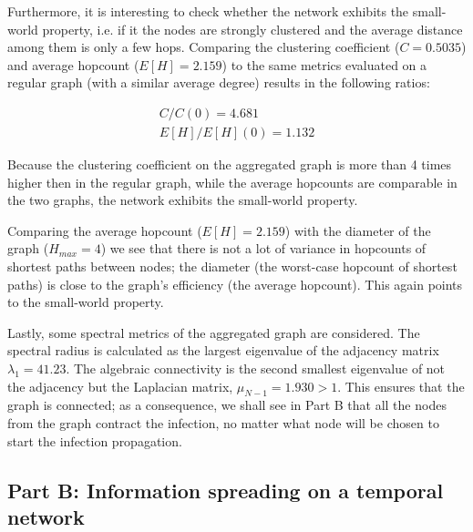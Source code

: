 \documentclass[letterpaper]{article}
\begin{document}
Furthermore, it is interesting to check whether the network exhibits the small-world property, i.e. if it the nodes are strongly clustered and the average distance among them is only a few hops. 
Comparing the clustering coefficient (\(C=0.5035\)) and average hopcount (\(E[H]=2.159\)) to the same metrics evaluated on a regular graph (with a similar average degree) results in the following ratios: 

\begin{align*}
C/C(0) = 4.681\\
E[H]/E[H](0) = 1.132
\end{align*}

Because the clustering coefficient on the aggregated graph is more than 4 times higher then in the regular graph, while the average hopcounts are comparable in the two graphs, the network exhibits the small-world property. 

Comparing the average hopcount (\(E[H]=2.159\)) with the diameter of the graph (\(H_{max}=4\)) we see that there is not a lot of variance in hopcounts of shortest paths between nodes; the diameter (the worst-case hopcount of shortest paths) is close to the graph's efficiency (the average hopcount). This again points to the small-world property.

Lastly, some spectral metrics of the aggregated graph are considered. The spectral radius is calculated as the largest eigenvalue of the adjacency matrix \(\lambda_1=41.23\). The algebraic connectivity is the second smallest eigenvalue of not the adjacency but the Laplacian matrix, \(\mu_{N-1}=1.930 > 1\). This ensures that the graph is connected; as a consequence, we shall see in Part B that all the nodes from the graph contract the infection, no matter what node will be chosen to start the infection propagation.


\subsection*{Part B: Information spreading on a temporal network}
\end{document}
